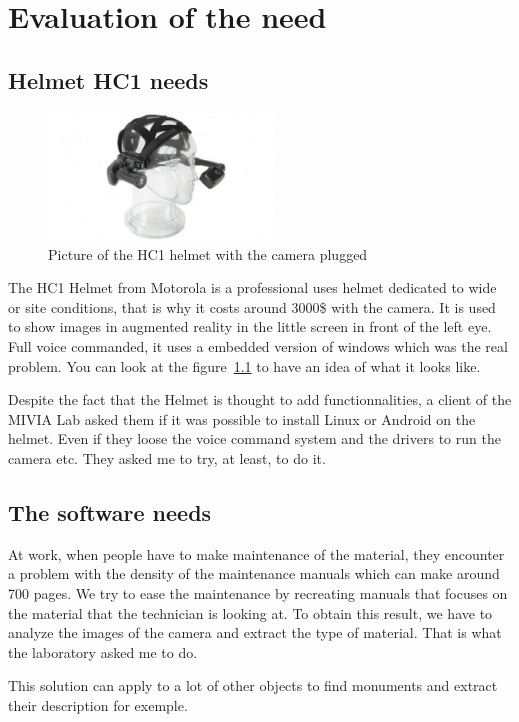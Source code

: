 \chapter{Evaluation of the need}

\section{Helmet HC1 needs}
\begin{figure}
 \begin{center}
	 \includegraphics[width=6cm]{images_not_compressed/motorola_hc1.jpg}
		\caption{Picture of the HC1 helmet with the camera plugged}
		\label{hc1}
	 \end{center}
 \end{figure}

 \par The HC1 Helmet from Motorola is a professional uses helmet dedicated to wide or site conditions, that is why it costs around 3000\$ with the camera. It is used to show images in augmented reality in the little screen in front of the left eye. Full voice commanded, it uses a embedded version of windows which was the real problem. You can look at the figure~\ref{hc1} to have an idea of what it looks like.
 
 \par Despite the fact that the Helmet is thought to add functionnalities, a client of the MIVIA Lab asked them if it was possible to install Linux or Android on the helmet. Even if they loose the voice command system and the drivers to run the camera etc. They asked me to try, at least, to do it.

\section{The software needs}
 \par At work, when people have to make maintenance of the material, they encounter a problem with the density of the maintenance manuals which can make around 700 pages. We try to ease the maintenance by recreating manuals that focuses on the material that the technician is looking at. To obtain this result, we have to analyze the images of the camera and extract the type of material. That is what the laboratory asked me to do.
 \par This solution can apply to a lot of other objects to find monuments and extract their description for exemple. 
	